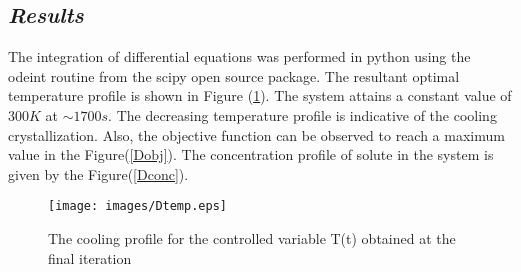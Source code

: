 \documentclass[3p,times,authoryear]{elsarticle}
\begin{document}
\subsection{\textit{Results}}
The integration of differential equations was performed in python using the odeint routine from the scipy open source package.
The resultant optimal temperature profile is shown in Figure (\ref{Dtemp}). The system attains a constant value of $300 K$ at $\sim1700 s$. The decreasing temperature profile is indicative of the cooling crystallization. Also, the objective function can be observed to reach a maximum value in the Figure(\ref{Dobj}). The concentration profile of solute in the system is given by the Figure(\ref{Dconc}). 

\begin{figure}[H] 
\begin{center}
\texttt{[image: images/Dtemp.eps]}
\end{center}
\caption{The cooling profile for the controlled variable T(t) obtained at the final iteration} \label{Dtemp}
\end{figure}
\end{document}
